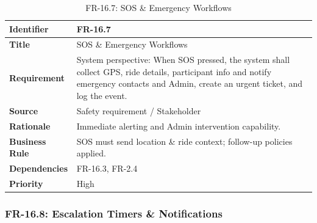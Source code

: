 \begin{longtable}{|p{3cm}|p{12cm}|}
\caption{FR-16.7: SOS \& Emergency Workflows}
\label{tab:fr-16-7} \\

\hline

\rowcolor{lightgray!30}

\textbf{Identifier} & FR-16.7 \\

\hline

\textbf{Title} & SOS \& Emergency Workflows \\

\hline

\textbf{Requirement} & System perspective: When SOS pressed, the system shall collect GPS, ride details, participant info and notify emergency contacts and Admin, create an urgent ticket, and log the event. \\

\hline

\textbf{Source} & Safety requirement / Stakeholder \\

\hline

\textbf{Rationale} & Immediate alerting and Admin intervention capability. \\

\hline

\textbf{Business Rule} & SOS must send location \& ride context; follow-up policies applied. \\

\hline

\textbf{Dependencies} & FR-16.3, FR-2.4 \\

\hline

\textbf{Priority} & High \\

\hline

\end{longtable}




\subsubsection{FR-16.8: Escalation Timers \& Notifications}



